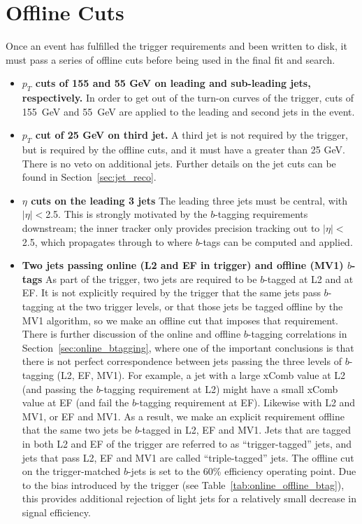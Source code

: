 









\section{Offline Cuts}

Once an event has fulfilled the trigger requirements and been written to disk,
it must pass a series of offline cuts before being used in the final fit and search. 

\begin{itemize}
\item
\textbf{$p_T$ cuts of 155 and 55 GeV on leading and sub-leading jets, respectively.}
In order to get out of the \pt turn-on curves of the trigger, cuts of
155~GeV and 55~GeV are applied to the leading and second jets in the
event.
\item
\textbf{$p_T$ cut of 25 GeV on third jet.}
A third jet is not required by the trigger, but is required by
the offline cuts, and it must have a \pt greater than 25 GeV.  There is
no veto on additional jets.  Further details on the jet cuts can be found
in Section~\ref{sec:jet_reco}.
\item
\textbf{$\eta$ cuts on the leading 3 jets}
The leading three jets must be central, with $|\eta|<$2.5.  This is strongly
motivated by the $b$-tagging requirements downstream; the inner tracker only 
provides precision tracking out to $|\eta|<$2.5, which propagates through
to where $b$-tags can be computed and applied.
\item
\textbf{Two jets passing online (L2 and EF in trigger) and offline (MV1) $b$-tags}
As part of the trigger, two jets are required to be $b$-tagged at L2 and at EF.  It
is not explicitly required by the trigger that the same jets pass $b$-tagging at the two trigger levels,
or that those jets be tagged offline by the MV1 algorithm, so we make an
offline cut that imposes that requirement.  There is further discussion of the online
and offline $b$-tagging correlations in Section~\ref{sec:online_btagging},
where one of the important conclusions is that there is not perfect correspondence
between jets passing the three levels of $b$-tagging (L2, EF, MV1).  For
example, a jet with a large xComb value at L2 (and passing the $b$-tagging
requirement at L2) might have a small xComb value at EF (and fail the $b$-tagging
requirement at EF).  Likewise with L2 and MV1, or EF and MV1.  As a result, we
make an explicit requirement offline that the same two jets be $b$-tagged in L2, EF
and MV1.  Jets that are tagged in both L2 and EF of the trigger are referred to as
``trigger-tagged'' jets, and jets that pass L2, EF and MV1 are called ``triple-tagged''
jets.
The offline cut on the
trigger-matched $b$-jets is set to the 60\% efficiency
operating point. Due to the bias introduced by the trigger (see
Table~\ref{tab:online_offline_btag}), this provides additional rejection of
light jets for a relatively small decrease in signal efficiency.



\end{itemize}
